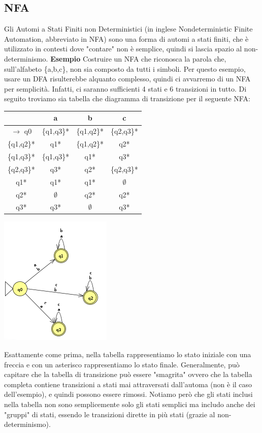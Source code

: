 \documentclass[]{article}
\begin{document}
		\subsection{NFA}
			Gli Automi a Stati Finiti non Deterministici (in inglese Nondeterministic Finite Automation, abbreviato in NFA) sono una forma di automi a stati finiti, che è utilizzato in contesti dove "contare" non è semplice, quindi si lascia spazio al non-determinismo. \newline
			\textbf{Esempio} Costruire un NFA che riconosca la parola che, sull'alfabeto \{a,b,c\}, non sia composto da tutti i simboli. \newline
			Per questo esempio, usare un DFA risulterebbe alquanto complesso, quindi ci avvarremo di un NFA per semplicità. Infatti, ci saranno sufficienti 4 stati e 6 transizioni in tutto. Di seguito troviamo sia tabella che diagramma di transizione per il seguente NFA:\newline
			\begin{center}
				\begin{tabular}{c|c|c|c}
					&a&b&c \\
					\hline
					$\rightarrow$ q0 &\{q1,q3\}*&\{q1,q2\}*&\{q2,q3\}* \\
					\{q1,q2\}* &q1*&\{q1,q2\}*&q2* \\
					\{q1,q3\}* &\{q1,q3\}*&q1*&q3* \\
					\{q2,q3\}* &q3*&q2*&\{q2,q3\}* \\
					q1* &q1*&q1*&$\emptyset$ \\
					q2* &$\emptyset$&q2*&q2* \\
					q3* &q3*&$\emptyset$&q3* \\
				\end{tabular}
			\includegraphics{NFA1.png}
			\end{center}
			Esattamente come prima, nella tabella rappresentiamo lo stato iniziale con una freccia e con un asterisco rappresentiamo lo stato finale. Generalmente, può capitare che la tabella di transizione può essere "smagrita" ovvero che la tabella completa contiene transizioni a stati mai attraversati dall'automa (non è il caso dell'esempio), e quindi possono essere rimossi. Notiamo però che gli stati inclusi nella tabella non sono semplicemente solo gli stati semplici ma includo anche dei "gruppi" di stati, essendo le transizioni dirette in più stati (grazie al non-determinismo).\newline
\end{document}
